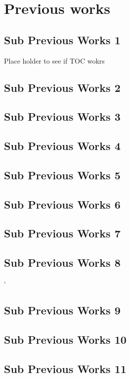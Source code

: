 \fancyhf{}
\fancyfoot[C]{ \thepage}
\chapter[Previous Works]{Previous works}
\section{Sub Previous Works 1}
Place holder to see if TOC wokrs
\section{Sub Previous Works 2}
\section{Sub Previous Works 3}
\section{Sub Previous Works 4}
\section{Sub Previous Works 5}
\section{Sub Previous Works 6}
\section{Sub Previous Works 7}
\section{Sub Previous Works 8}`
\section{Sub Previous Works 9}
\section{Sub Previous Works 10}
\section{Sub Previous Works 11}
